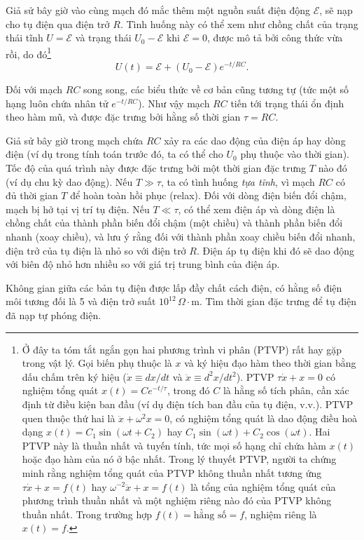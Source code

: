 Giả sử bây giờ vào cùng mạch đó mắc thêm một nguồn suất điện động $\mathcal{E}$, sẽ nạp cho tụ điện qua điện trở $R$. Tình huống này có thể xem như chồng chất của trạng thái tĩnh $U=\mathcal{E}$ và trạng thái $U_0 - \mathcal{E}$ khi $\mathcal{E}=0$, được mô tả bởi công thức vừa rồi, do đó\footnote{Ở đây ta tóm tắt ngắn gọn hai phương trình vi phân (PTVP) rất hay gặp trong vật lý. Gọi biến phụ thuộc là $x$ và ký hiệu đạo hàm theo thời gian bằng dấu chấm trên ký hiệu ($\dot x \equiv dx/dt$ và $\ddot x \equiv d^2x/dt^2$). PTVP $\tau\dot x + x = 0$ có nghiệm tổng quát $x(t)=Ce^{-t/\tau}$, trong đó $C$ là hằng số tích phân, cần xác định từ điều kiện ban đầu (ví dụ điện tích ban đầu của tụ điện, v.v.). PTVP quen thuộc thứ hai là $\ddot x + \omega^2 x = 0$, có nghiệm tổng quát là dao động điều hoà dạng $x(t)=C_1\sin(\omega t + C_2)$ hay $C_1\sin(\omega t)+C_2\cos(\omega t)$. Hai PTVP này là thuần nhất và tuyến tính, tức mọi số hạng chỉ chứa hàm $x(t)$ hoặc đạo hàm của nó ở bậc nhất. Trong lý thuyết PTVP, người ta chứng minh rằng nghiệm tổng quát của PTVP không thuần nhất tương ứng $\tau\dot x + x = f(t)$ hay $\omega^{-2}\ddot x + x = f(t)$ là tổng của nghiệm tổng quát của phương trình thuần nhất và một nghiệm riêng nào đó của PTVP không thuần nhất. Trong trường hợp $f(t)=\text{hằng số}=f$, nghiệm riêng là $x(t)=f$.}
\[
U(t) = \mathcal{E} + (U_0-\mathcal{E})e^{-t/RC}.
\]

Đối với mạch $RC$ song song, các biểu thức về cơ bản cũng tương tự (tức một số hạng luôn chứa nhân tử $e^{-t/RC}$). Như vậy mạch $RC$ tiến tới trạng thái ổn định theo hàm mũ, và được đặc trưng bởi hằng số thời gian $\tau = RC$.

Giả sử bây giờ trong mạch chứa $RC$ xảy ra các dao động của điện áp hay dòng điện (ví dụ trong tính toán trước đó, ta có thể cho $U_0$ phụ thuộc vào thời gian). Tốc độ của quá trình này được đặc trưng bởi một thời gian đặc trưng $T$ nào đó (ví dụ chu kỳ dao động). Nếu $T \gg \tau$, ta có tình huống \emph{tựa tĩnh}, vì mạch $RC$ có đủ thời gian $T$ để hoàn toàn hồi phục (relax). Đối với dòng điện biến đổi chậm, mạch bị hở tại vị trí tụ điện. Nếu $T \ll \tau$, có thể xem điện áp và dòng điện là chồng chất của thành phần biến đổi chậm (một chiều) và thành phần biến đổi nhanh (xoay chiều), và lưu ý rằng đối với thành phần xoay chiều biến đổi nhanh, điện trở của tụ điện là nhỏ so với điện trở $R$. Điện áp tụ điện khi đó sẽ dao động với biên độ nhỏ hơn nhiều so với giá trị trung bình của điện áp.

 Không gian giữa các bản tụ điện được lấp đầy chất cách điện, có hằng số điện môi tương đối là 5 và điện trở suất $10^{12}\,\Omega\cdot\mathrm{m}$. Tìm thời gian đặc trưng để tụ điện đã nạp tự phóng điện.

